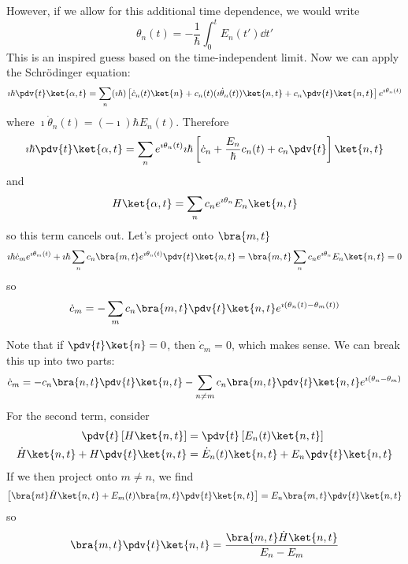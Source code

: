 \documentclass[a4paper,twoside,master.tex]{subfiles}
\begin{document}
However, if we allow for this additional time dependence, we would write
\begin{equation}
    \theta_n(t) = - \frac{1}{\hbar} \int_0^t E_n(t') \dd{t'}
\end{equation}
This is an inspired guess based on the time-independent limit. Now we can apply the Schr\"odinger equation:
\begin{equation}
    \imath \hbar \pdv{t}\ket{\alpha, t} = \sum_n (\imath \hbar)\left[ \dot{c}_n(t)\ket{n} + c_n(t) (\imath \dot{\theta}_n(t))\ket{n, t} + c_n  \pdv{t}\ket{n,t}\right] e^{\imath \theta_n(t)}
\end{equation}
where $ \imath \dot{\theta}_n(t) = (-\imath) \hbar E_n(t) $. Therefore
\begin{equation}
    \imath \hbar \pdv{t}\ket{\alpha, t} = \sum_n e^{\imath \theta_n(t)} \imath \hbar \left[ \dot{c}_n + \frac{E_n}{\hbar} c_n(t) + c_n \pdv{t} \right]\ket{n,t}
\end{equation}
and
\begin{equation}
    H\ket{\alpha, t} = \sum_n c_n e^{\imath \theta_n} E_n\ket{n,t}
\end{equation}
so this term cancels out. Let's project onto $\bra{m,t} $
\begin{equation}
    \imath \hbar \dot{c}_m e^{\imath \theta_m(t)} + \imath \hbar \sum_n c_n\bra{m, t} e^{\imath \theta_n(t)} \pdv{t}\ket{n, t} =\bra{m, t} \sum_n c_n e^{\imath \theta_n} E_n\ket{n, t} = 0
\end{equation}
so
\begin{equation}
    \dot{c}_m = -\sum_m c_n\bra{m, t} \pdv{t}\ket{n, t} e^{\imath (\theta_n(t) - \theta_m(t))}
\end{equation}

Note that if $ \pdv{t}\ket{n} = 0 $, then $ \dot{c}_m = 0 $, which makes sense. We can break this up into two parts:
\begin{equation}
    \dot{c}_m = -c_n \bra{n, t} \pdv{t}\ket{n, t} - \sum_{n \neq m} c_n\bra{m,t} \pdv{t}\ket{n, t} e^{\imath (\theta_n - \theta_m)}
\end{equation}
For the second term, consider
\begin{align}
    \pdv{t} \left[ H\ket{n,t}\right] &= \pdv{t}\left[E_n(t)\ket{n,t} \right]\\
    \dot{H}\ket{n, t} + H \pdv{t}\ket{n,t} &= \dot{E}_n(t)\ket{n, t} + E_n \pdv{t}\ket{n, t}
\end{align}
If we then project onto $ m \neq n $, we find
\begin{equation}
    \left[\bra{n t} \dot{H}\ket{n, t} + E_m(t)\bra{m, t} \pdv{t}\ket{n, t}\right] = E_n\bra{m, t} \pdv{t}\ket{n, t}
\end{equation}
so
\begin{equation}
    \bra{m, t} \pdv{t}\ket{n, t} = \frac{\bra{m,t} \dot{H}\ket{n,t}}{E_n - E_m}
\end{equation}
\end{document}
